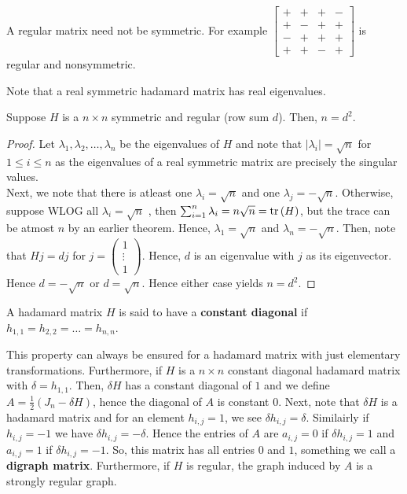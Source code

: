 \begin{remark}
	A regular matrix need not be symmetric. For example \(\begin{bmatrix} +&+&+&-\\
	+&-&+&+\\
-&+&+&+\\
+&+&-&+\end{bmatrix} \)  is regular and nonsymmetric.
\end{remark}
Note that a real symmetric hadamard matrix has real eigenvalues.
\begin{proposition}
	Suppose \(H\) is a \(n \times n\) symmetric and regular (row sum \(d\)). Then, \(n = d^2\).
\end{proposition}
\begin{proof}
	Let \(\lambda_1, \lambda_2, \ldots, \lambda_{n}\) be the eigenvalues of \(H\) and note that \(\left| \lambda_{i} \right|  = \sqrt{n} \) for \(1\le i \le n\) as the eigenvalues of a real symmetric matrix are precisely the singular values.\\
	Next, we note that there is atleast one \(\lambda_{i} = \sqrt{n} \) and one \(\lambda_{j} = - \sqrt{n} \). Otherwise, suppose WLOG all \(\lambda_{i} = \sqrt{n} \) , then \(\sum_{i= 1}^{n} \lambda_{i} = n\sqrt{n}  = \operatorname{tr} \left( H \right) \), but the trace can be atmost \(n\) by an earlier theorem. Hence, \(\lambda_1 = \sqrt{n} \) and \(\lambda_{n} = -\sqrt{n} \). Then, note that \(H j = dj\) for \(j = \begin{pmatrix} 1 \\ \vdots\\ 1 \end{pmatrix}\). Hence, \(d\) is an eigenvalue with \(j\) as its eigenvector. Hence \(d = -\sqrt{n} \) or \(d = \sqrt{n} \). Hence either case yields \(n = d^2\).
\end{proof}
\begin{definition}
	A hadamard matrix \(H\) is said to have a \textbf{constant diagonal} if \(h_{1, 1} = h_{2, 2} = \ldots = h_{n, n}\).
\end{definition}
This property can always be ensured for a hadamard matrix with just elementary transformations. Furthermore, if \(H\) is a \(n \times n\) constant diagonal hadamard matrix with \(\delta = h_{1, 1}\). Then, \(\delta H\) has a constant diagonal of \(1\) and we define \(A = \frac{1}{2} \left( J_{n} - \delta H \right) \), hence the diagonal of \(A\) is constant \(0\). Next, note that \(\delta H\) is a hadamard matrix and for an element \(h_{i, j} = 1\), we see \(\delta h_{i, j} = \delta\). Similairly if \(h_{i, j} = -1\) we have \(\delta h_{i, j} = -\delta\). Hence the entries of \(A\) are \(a_{i, j} = 0\) if \(\delta h_{i, j} = 1\) and \(a_{i, j} = 1\) if \(\delta h_{i, j} = -1\). So, this matrix has all entries \(0\) and \(1\), something we call a \textbf{digraph matrix}. Furthermore, if \(H\) is regular, the graph induced by \(A\) is a strongly regular graph.
